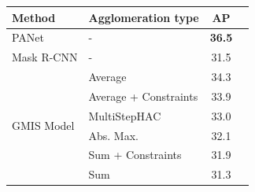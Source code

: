 \begin{table}[t]
\centering
\begin{subtable}{0.5 \textwidth}
    \centering
    \scriptsize
        \begin{tabular}{l|l|cc}


Method & Agglomeration type & AP \\ \midrule
PANet \cite{liu2018path} & - & \textbf{36.5} \\
Mask R-CNN \cite{he2017mask} & - & 31.5 \\ \hline
 & \algname{} Average& 34.3 \\
 & \algname{} Average + Constraints & 33.9 \\
\multirow{2}{*}{GMIS Model \cite{liu2018affinity}} & MultiStepHAC \cite{liu2018affinity} & 33.0 \\
 & \algname{} Abs. Max. \cite{wolf2018mutex}  & 32.1 \\
 & \algname{} Sum + Constraints  \cite{levinkov2017comparative} & 31.9  \\
 & \algname{} Sum \cite{keuper2015efficient} & 31.3 \\


\end{tabular}
\end{subtable}
\end{table}
